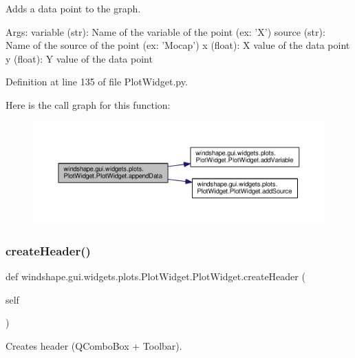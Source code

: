 \begin{DoxyVerb}Adds a data point to the graph.

Args:
    variable (str): Name of the variable of the point (ex: 'X')
    source (str): Name of the source of the point (ex: 'Mocap')
    x (float): X value of the data point
    y (float): Y value of the data point
\end{DoxyVerb}
 

Definition at line 135 of file Plot\+Widget.\+py.

Here is the call graph for this function\+:\nopagebreak
\begin{figure}[H]
\begin{center}
\leavevmode
\includegraphics[width=350pt]{classwindshape_1_1gui_1_1widgets_1_1plots_1_1_plot_widget_1_1_plot_widget_a122553b70fe15d951e9314a7881be4d4_cgraph}
\end{center}
\end{figure}
\mbox{\label{classwindshape_1_1gui_1_1widgets_1_1plots_1_1_plot_widget_1_1_plot_widget_aff7be7cb0167f5e4a6e5706afebeadba}} 
\subsubsection{\texorpdfstring{create\+Header()}{createHeader()}}
{\footnotesize\ttfamily def windshape.\+gui.\+widgets.\+plots.\+Plot\+Widget.\+Plot\+Widget.\+create\+Header (\begin{DoxyParamCaption}\item[{}]{self }\end{DoxyParamCaption})}

\begin{DoxyVerb}Creates header (QComboBox + Toolbar).\end{DoxyVerb}
 

